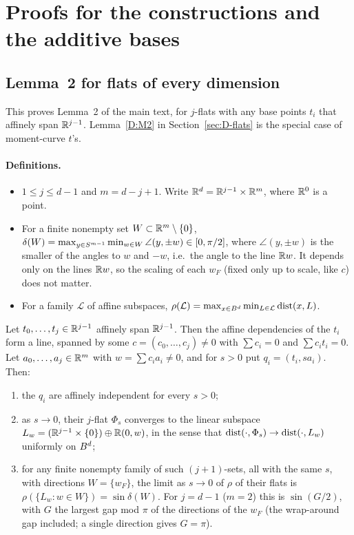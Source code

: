 \section{Proofs for the constructions and the additive bases}
\label{app:B}

\subsection{Lemma~2 for flats of every dimension}\label{sec:B-lemma2}

This proves Lemma~2 of the main text, for $j$-flats with any base points $t_i$ that affinely span
$\mathbb{R}^{j-1}$. Lemma~\ref{D:M2} in Section~\ref{sec:D-flats} is the special case of moment-curve $t$'s.

\paragraph{Definitions.}
\begin{itemize}
  \item $1 \le j \le d-1$ and $m = d-j+1$. Write $\mathbb{R}^d = \mathbb{R}^{j-1} \times \mathbb{R}^m$, where $\mathbb{R}^0$ is a
    point.
  \item For a finite nonempty set $W \subset \mathbb{R}^m \setminus \{0\}$,
    $\delta(W) = \max_{y \in S^{m-1}} \min_{w \in W} \angle(y, \pm w) \in [0, \pi/2]$, where
    $\angle(y, \pm w)$ is the smaller of the angles to $w$ and $-w$, i.e.\ the angle to the line
    $\mathbb{R} w$. It depends only on the lines $\mathbb{R} w$, so the scaling of each $w_F$ (fixed only up to
    scale, like $c$) does not matter.
  \item For a family $\mathcal{L}$ of affine subspaces,
    $\rho(\mathcal{L}) = \max_{x \in B^d} \min_{L \in \mathcal{L}} \operatorname{dist}(x, L)$.
\end{itemize}

\begin{lemma}\label{lem:B-lemma2-flats}
Let $t_0, \dots, t_j \in \mathbb{R}^{j-1}$ affinely span $\mathbb{R}^{j-1}$. Then the affine dependencies of the
$t_i$ form a line, spanned by some $c = (c_0, \dots, c_j) \ne 0$ with $\sum c_i = 0$ and
$\sum c_i t_i = 0$. Let $a_0, \dots, a_j \in \mathbb{R}^m$ with $w = \sum c_i a_i \ne 0$, and for $s > 0$
put $q_i = (t_i, s a_i)$. Then:
\begin{enumerate}[label=(\roman*)]
  \item the $q_i$ are affinely independent for every $s > 0$;
  \item as $s \to 0$, their $j$-flat $\Phi_s$ converges to the linear subspace
    $L_w = (\mathbb{R}^{j-1} \times \{0\}) \oplus \mathbb{R}(0, w)$, in the sense that
    $\operatorname{dist}(\cdot, \Phi_s) \to \operatorname{dist}(\cdot, L_w)$ uniformly on $B^d$;
  \item for any finite nonempty family of such $(j+1)$-sets, all with the same $s$, with
    directions $W = \{w_F\}$, the limit as $s \to 0$ of $\rho$ of their flats is
    $\rho(\{L_w : w \in W\}) = \sin \delta(W)$. For $j = d-1$ ($m = 2$) this is $\sin(G/2)$, with
    $G$ the largest gap mod $\pi$ of the directions of the $w_F$ (the wrap-around gap included; a
    single direction gives $G = \pi$).
\end{enumerate}
\end{lemma}

